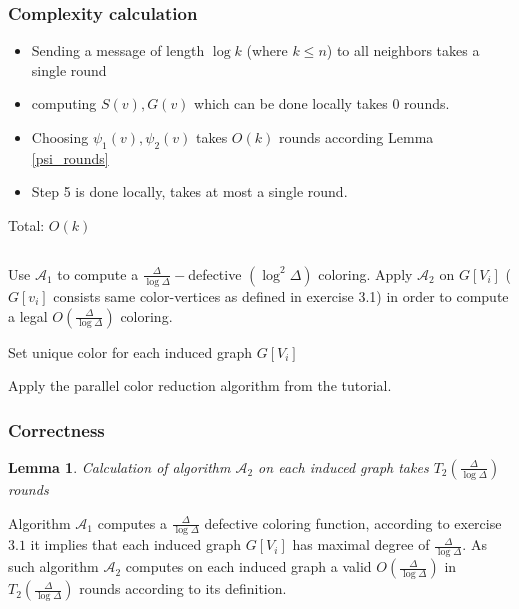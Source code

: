 \documentclass[11pt]{article}
\newtheorem{lemma}[theorem]{Lemma}
\begin{document}
\subsubsection*{Complexity calculation}
\begin{itemize}
    \item Sending a message of length $\log{k}$ (where $k \le n$) to all neighbors takes a single round
    \item computing $S(v), G(v)$ which can be done locally takes 0 rounds.
    \item Choosing $\psi_1(v), \psi_2(v)$ takes $O(k)$ rounds according Lemma \ref{psi_rounds}
    \item Step 5 is done locally, takes at most a single round.
\end{itemize}
Total: $O(k)$


\subsection{}

\begin{algorithmic}[1]
\State Use $\mathcal{A}_1$ to compute a $\frac{\Delta}{\log{\Delta}}-$defective $(\log^2{\Delta})$ coloring.
    \State Apply $\mathcal{A}_2$ on $G[V_i]$ ($G[v_i]$ consists same color-vertices as defined in exercise 3.1) in order to compute a legal $O(\frac{\Delta}{\log{\Delta}})$ coloring.
\EndFor

\State Set unique color for each induced graph $G[V_i]$


\State Apply the parallel color reduction algorithm from the tutorial.

\end{algorithmic}

\subsubsection*{Correctness}

\begin{lemma}
Calculation of algorithm $\mathcal{A}_2$ on each induced graph takes $T_2(\frac{\Delta}{\log{\Delta}})$ rounds
\end{lemma}
Algorithm $\mathcal{A}_1$ computes a $\frac{\Delta}{\log{\Delta}}$ defective coloring function, according to exercise $3.1$ it implies that each induced graph $G[V_i]$ has maximal degree of $\frac{\Delta}{\log{\Delta}}$. As such algorithm $\mathcal{A}_2$ computes on each induced graph a valid $O(\frac{\Delta}{\log{\Delta}})$ in $T_2(\frac{\Delta}{\log{\Delta}})$ rounds according to its definition.
\end{document}

